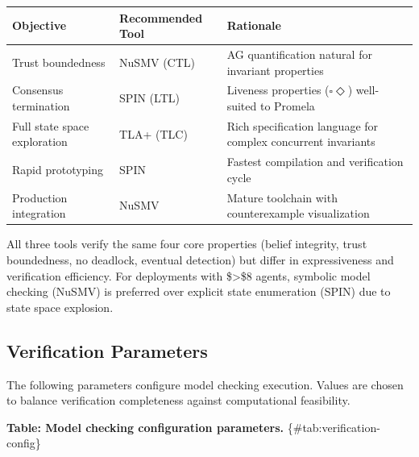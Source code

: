 \documentclass[
]{article}
\newcounter{none} %
\begin{document}
{\def\LTcaptype{none} %
\begin{longtable}[]{@{}
  >{\raggedright\arraybackslash}p{}
  >{\raggedright\arraybackslash}p{}
  >{\raggedright\arraybackslash}p{}@{}}
\toprule\noalign{}
\begin{minipage}[b]{\linewidth}\raggedright
Objective
\end{minipage} & \begin{minipage}[b]{\linewidth}\raggedright
Recommended Tool
\end{minipage} & \begin{minipage}[b]{\linewidth}\raggedright
Rationale
\end{minipage} \\
\midrule\noalign{}
\endhead
\bottomrule\noalign{}
\endlastfoot
Trust boundedness & NuSMV (CTL) & AG quantification natural for
invariant properties \\
Consensus termination & SPIN (LTL) & Liveness properties
(\(\square \Diamond\)) well-suited to Promela \\
Full state space exploration & TLA+ (TLC) & Rich specification language
for complex concurrent invariants \\
Rapid prototyping & SPIN & Fastest compilation and verification cycle \\
Production integration & NuSMV & Mature toolchain with counterexample
visualization \\
\end{longtable}
}

All three tools verify the same four core properties (belief integrity,
trust boundedness, no deadlock, eventual detection) but differ in
expressiveness and verification efficiency. For deployments with
\$\textgreater\$8 agents, symbolic model checking (NuSMV) is preferred
over explicit state enumeration (SPIN) due to state space explosion.

\subsection{Verification Parameters}\label{sec:verification-params}

The following parameters configure model checking execution. Values are
chosen to balance verification completeness against computational
feasibility.

\textbf{Table: Model checking configuration parameters.}
\{\#tab:verification-config\}
\end{document}
